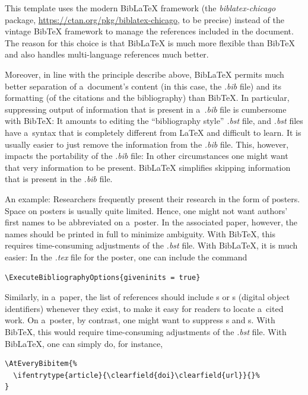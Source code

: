 \documentclass[11pt, a4paper, oneside]{article}
\newlength{\baselinedist}
\newlength{\smalllinespacing}
\renewenvironment{quote}{%
	\par\list{}{%
		\baselineskip = \smalllinespacing%
		\leftmargin = \baselineskip%
		\rightmargin = \leftmargin%
		\topsep = 0.5\baselinedist plus 3ex
	}
	\item\relax%
}{%
	\endlist%
}
\renewcommand{\caps}[1]{{\textscale{0.97}{\textls[50]{\MakeUppercase{#1}}}}}
\theoremstyle{Plain}
\theoremstyle{Definition}
\theoremstyle{Remark}
\begin{document}
This template uses the modern BibLaTeX framework (the \textit{biblatex-chicago} package, \url{https://ctan.org/pkg/biblatex-chicago}, to be precise) instead of the vintage BibTeX framework to manage the references included in the document. The reason for this choice is that BibLaTeX is much more flexible than BibTeX and also handles multi-language references much better.

Moreover, in line with the principle describe above, BibLaTeX permits much better separation of a~document's content (in this case, the \textit{.bib} file) and its formatting (of the citations and the bibliography) than BibTeX. In particular, suppressing output of information that is present in a~\textit{.bib} file is cumbersome with BibTeX: It amounts to editing the ``bibliography style'' \textit{.bst} file, and \textit{.bst} files have a~syntax that is completely different from LaTeX and difficult to learn. It is usually easier to just remove the information from the \textit{.bib} file. This, however, impacts the portability of the \textit{.bib} file: In other circumstances one might want that very information to be present. BibLaTeX simplifies skipping information that is present in the \textit{.bib} file.

An example: Researchers frequently present their research in the form of posters. Space on posters is usually quite limited. Hence, one might not want authors' first names to be abbreviated on a~poster. In the associated paper, however, the names should be printed in full to minimize ambiguity. With BibTeX, this requires time-consuming adjustments of the \textit{.bst} file. With BibLaTeX, it is much easier: In the \textit{.tex} file for the poster, one can include the command
\begin{quote}
	\verb|\ExecuteBibliographyOptions{giveninits = true}|
\end{quote}

Similarly, in a~paper, the list of references should include \caps{URL}s or \caps{DOI}s (digital object identifiers) whenever they exist, to make it easy for readers to locate a~cited work. On a~poster, by contrast, one might want to suppress \caps{DOI}s and \caps{URL}s. With BibTeX, this would require time-consuming adjustments of the \textit{.bst} file. With BibLaTeX, one can simply do, for instance,
\begin{quote}
\begin{verbatim}
\AtEveryBibitem{%
  \ifentrytype{article}{\clearfield{doi}\clearfield{url}}{}%
}
\end{verbatim}
\end{quote}
\end{document}
